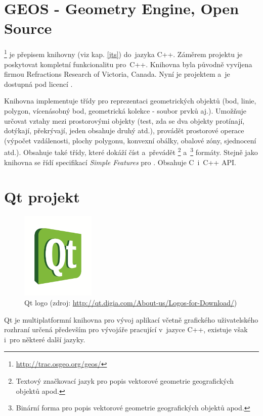 \section{GEOS - Geometry Engine, Open Source}
\label{geos}

\footnote{\url{http://trac.osgeo.org/geos/}}  je přepisem 
knihovny  (viz kap. \ref{jts}) do~jazyka C++. Záměrem 
projektu je poskytovat kompletní funkcionalitu  pro~C++. Knihovna 
byla původně vyvíjena firmou Refractions Research of Victoria, Canada. Nyní 
je projektem  a~je dostupná pod licencí .

Knihovna  implementuje třídy pro reprezentaci geometrických
objektů (bod, linie, polygon, vícenásobný bod, geometrická kolekce
- soubor prvků aj.). Umožňuje určovat vztahy mezi prostorovými objekty 
(test, zda se dva objekty protínají, dotýkají, překrývají, jeden obsahuje 
druhý atd.), provádět prostorové operace (výpočet vzdálenosti, plochy 
polygonu, konvexní obálky, obalové zóny, sjednocení atd.). Obsahuje také 
třídy, které dokáží číst a~převádět \footnote{Textový 
značkovací jazyk pro popis vektorové geometrie geografických objektů 
apod.} a~\footnote{Binární forma pro popis vektorové 
geometrie geografických objektů apod.} formáty. Stejně jako knihovna 
 se řídí specifikací \textit{Simple Features} pro .
Obsahuje C~i~C++ API.

\section{Qt projekt}
\label{qt}

  \begin{figure}[hbt]
    \centering
      \includegraphics[width=100pt]{./pictures/qt.png}
      \caption[Qt logo]{Qt logo 
	(zdroj: \url{http://qt.digia.com/About-us/Logos-for-Download/})}
      \label{fig:qt}
  \end{figure}

Qt je multiplatformní knihovna pro vývoj aplikací včetně grafického 
uživatelského rozhraní určená především pro vývojáře pracující 
v~jazyce C++, existuje však i~pro některé další jazyky.

